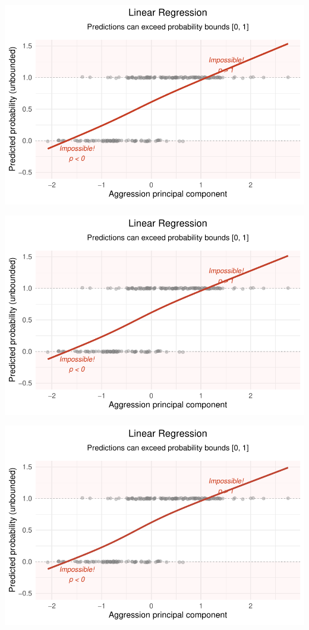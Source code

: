 \documentclass[
  letterpaper,
  DIV=11,
  numbers=noendperiod]{scrartcl}
\begin{document}
\begin{center}
\includegraphics[width=0.8\linewidth,height=\textheight,keepaspectratio]{Beyond!!!_files/figure-pdf/unnamed-chunk-4-30.pdf}
\end{center}

\begin{center}
\includegraphics[width=0.8\linewidth,height=\textheight,keepaspectratio]{Beyond!!!_files/figure-pdf/unnamed-chunk-4-31.pdf}
\end{center}

\begin{center}
\includegraphics[width=0.8\linewidth,height=\textheight,keepaspectratio]{Beyond!!!_files/figure-pdf/unnamed-chunk-4-32.pdf}
\end{center}
\end{document}

